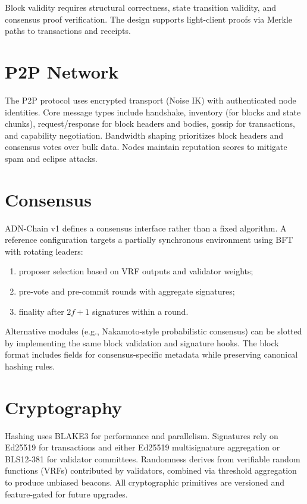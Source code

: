 \documentclass[11pt]{article}
\begin{document}
Block validity requires structural correctness, state transition validity, and consensus proof verification. The design supports light-client proofs via Merkle paths to transactions and receipts.

\section{P2P Network}
The P2P protocol uses encrypted transport (Noise IK) with authenticated node identities. Core message types include handshake, inventory (for blocks and state chunks), request/response for block headers and bodies, gossip for transactions, and capability negotiation. Bandwidth shaping prioritizes block headers and consensus votes over bulk data. Nodes maintain reputation scores to mitigate spam and eclipse attacks.

\section{Consensus}
ADN-Chain v1 defines a consensus interface rather than a fixed algorithm. A reference configuration targets a partially synchronous environment using BFT with rotating leaders:
\begin{enumerate}[noitemsep]
  \item proposer selection based on VRF outputs and validator weights;
  \item pre-vote and pre-commit rounds with aggregate signatures;
  \item finality after \(2f+1\) signatures within a round.
\end{enumerate}

Alternative modules (e.g., Nakamoto-style probabilistic consensus) can be slotted by implementing the same block validation and signature hooks. The block format includes fields for consensus-specific metadata while preserving canonical hashing rules.

\section{Cryptography}
Hashing uses BLAKE3 for performance and parallelism. Signatures rely on Ed25519 for transactions and either Ed25519 multisignature aggregation or BLS12-381 for validator committees. Randomness derives from verifiable random functions (VRFs) contributed by validators, combined via threshold aggregation to produce unbiased beacons. All cryptographic primitives are versioned and feature-gated for future upgrades.
\end{document}
